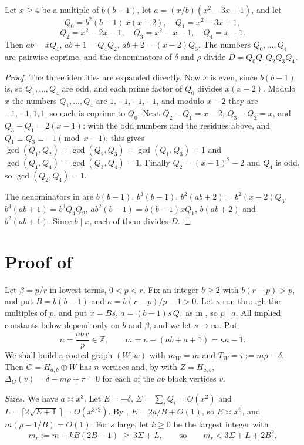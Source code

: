 \documentclass[11pt,a4paper]{report}
\begin{document}
\begin{lemma}\label{lem:moduli}
Let \(x\ge4\) be a multiple of \(b(b-1)\), let \(a=(x/b)(x^2-3x+1)\), and let
\[Q_0=b^2(b-1)\,x(x-2),\quad Q_1=x^2-3x+1,\]
\[Q_2=x^2-2x-1,\quad Q_3=x^2-x-1,\quad Q_4=x-1.\]
Then \(ab=xQ_1\), \(ab+1=Q_4Q_2\), \(ab+2=(x-2)Q_3\). The numbers \(Q_0,\dots,Q_4\) are pairwise coprime, and the denominators of
\(\delta\) and \(\rho\) divide \(D=Q_0Q_1Q_2Q_3Q_4\).
\end{lemma}
\begin{proof}
The three identities are expanded directly. Now \(x\) is even, since \(b(b-1)\) is, so \(Q_1,\dots,Q_4\) are odd, and each prime
factor of \(Q_0\) divides \(x(x-2)\). Modulo \(x\) the numbers \(Q_1,\dots,Q_4\) are \(1,-1,-1,-1\), and modulo \(x-2\) they
are \(-1,-1,1,1\); so each is coprime to \(Q_0\). Next \(Q_2-Q_1=x-2\), \(Q_3-Q_2=x\), and \(Q_3-Q_1=2(x-1)\); with the odd
numbers and the residues above, and \(Q_1\equiv Q_3\equiv-1\pmod{x-1}\), this gives \(\gcd(Q_1,Q_2)=\gcd(Q_2,Q_3)=\gcd(Q_1,Q_3)=1\)
and \(\gcd(Q_1,Q_4)=\gcd(Q_3,Q_4)=1\). Finally \(Q_2=(x-1)^2-2\) and \(Q_4\) is odd, so \(\gcd(Q_2,Q_4)=1\).

The denominators in  are \(b(b-1)\), \(b^3(b-1)\), \(b^2(ab+2)=b^2(x-2)Q_3\), \(b^3(ab+1)=b^3Q_4Q_2\),
\(ab^2(b-1)=b(b-1)xQ_1\), \(b(ab+2)\) and \(b^2(ab+1)\). Since \(b\mid x\), each of them divides \(D\).
\end{proof}

\section{Proof of }\label{sec:proof}

Let \(\beta=p/r\) in lowest terms, \(0<p<r\). Fix an integer \(b\ge2\) with \(b(r-p)>p\), and put \(B=b(b-1)\) and
\(\kappa=b(r-p)/p-1>0\). Let \(s\) run through the multiples of \(p\), and put \(x=Bs\), \(a=(b-1)s\,Q_1\) as in
, so \(p\mid a\). All implied constants below depend only on \(b\) and \(\beta\), and we let \(s\to\infty\).
Put
\[n=\frac{ab\,r}p\in\mathbb Z,\qquad m=n-(ab+a+1)=\kappa a-1.\]
We shall build a rooted graph \((W,w)\) with \(m_W=m\) and \(T_W=\tau:=m\rho-\delta\). Then \(G=H_{a,b}\oplus W\) has \(n\) vertices
and, by  with \(Z=H_{a,b}\), \(\Delta_G(v)=\delta-m\rho+\tau=0\) for each of the \(ab\) block vertices \(v\).

\emph{Sizes.} We have \(a\asymp x^3\). Let \(E=-\delta\), \(\Sigma=\sum_iQ_i=O(x^2)\) and
\(L=\lceil2\sqrt{E+1}\,\rceil=O(x^{3/2})\). By , \(E=2a/B+O(1)\), so \(E\asymp x^3\), and \(m(\rho-1/B)=O(1)\). For
\(s\) large, let \(k\ge0\) be the largest integer with
\[m_r:=m-kB(2B-1)\ \ge\ 3\Sigma+L,\qquad\text{so}\qquad m_r<3\Sigma+L+2B^2.\]
\end{document}
